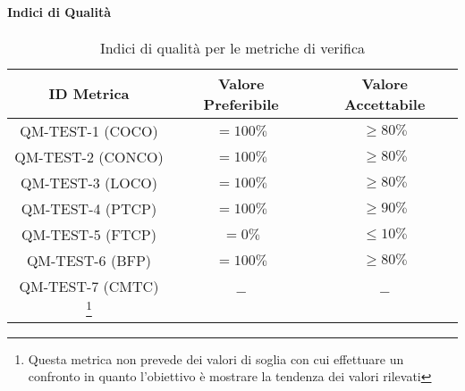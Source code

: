 		\paragraph{Indici di Qualità}

			\begin{center}
				\begin{longtable}{|c|c|c|}
				\hline
				\rowcolor{lighter-grayer}
				\textbf{ID Metrica} & \textbf{Valore Preferibile} & \textbf{Valore Accettabile}\\
				\hline
				\endfirsthead
				\hline
				QM-TEST-1 (COCO) & \(= 100\%\) & \(\geq 80\%\) \\ \hline
				QM-TEST-2 (CONCO) & \(= 100\%\) & \(\geq 80\%\) \\ \hline
				QM-TEST-3 (LOCO) & \(= 100\%\) & \(\geq 80\%\) \\ \hline
				QM-TEST-4 (PTCP) & \(= 100\%\) & \(\geq 90\%\) \\ \hline
				QM-TEST-5 (FTCP) & \(= 0\%\) & \(\le 10\%\) \\ \hline
				QM-TEST-6 (BFP) & \(= 100\%\) & \(\geq 80\%\) \\ \hline
				QM-TEST-7 (CMTC) \footnote{Questa metrica non prevede dei valori di soglia con cui effettuare un confronto in quanto l'obiettivo è mostrare la tendenza dei valori rilevati} & \(-\) & \(-\) \\ \hline
				\hline
				\caption{Indici di qualità per le metriche di verifica}
				\end{longtable}
			\end{center}
